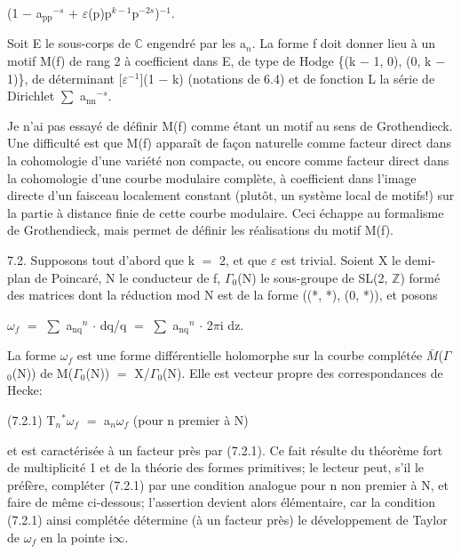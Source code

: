 \documentclass[10pt,twoside]{article}
\begin{document}
(1 \ensuremath{−} a\ensuremath{_{\mathrm{pp}}}\ensuremath{^{-s}} \ensuremath{+} \ensuremath{ε}(p)p\ensuremath{^{k−1}}p\ensuremath{^{-2s}})\ensuremath{^{-1}}.\par
Soit E le sous-corps de \ensuremath{ℂ} engendré par les a\ensuremath{_{n}}. La forme f doit donner lieu à un motif M(f) de rang 2 à coefficient dans E, de type de Hodge \{(k \ensuremath{−} 1, 0), (0, k \ensuremath{−} 1)\}, de déterminant [\ensuremath{ε}\ensuremath{^{-1}}](1 \ensuremath{−} k) (notations de 6.4) et de fonction L la série de Dirichlet \ensuremath{∑} a\ensuremath{_{\mathrm{nn}}}\ensuremath{^{-s}}.\par
Je n’ai pas essayé de définir M(f) comme étant un motif au sens de Grothendieck. Une difficulté est que M(f) apparaît de façon naturelle comme facteur direct dans la cohomologie d’une variété non compacte, ou encore comme facteur direct dans la cohomologie d’une courbe modulaire complète, à coefficient dans l’image directe d’un faisceau localement constant (plutôt, un système local de motifs!) sur la partie à distance finie de cette courbe modulaire. Ceci échappe au formalisme de Grothendieck, mais permet de définir les réalisations du motif M(f).\par
7.2. Supposons tout d’abord que k \ensuremath{=} 2, et que \ensuremath{ε} est trivial. Soient X le demi-plan de Poincaré, N le conducteur de f, \ensuremath{Γ}\ensuremath{_{0}}(N) le sous-groupe de SL(2, \ensuremath{ℤ}) formé des matrices dont la réduction mod N est de la forme ((*, *), (0, *)), et posons\par
\ensuremath{ω}\ensuremath{_{f}} \ensuremath{=} \ensuremath{∑} a\ensuremath{_{\mathrm{nq}}}\ensuremath{^{n}} \ensuremath{·} dq/q \ensuremath{=} \ensuremath{∑} a\ensuremath{_{\mathrm{nq}}}\ensuremath{^{n}} \ensuremath{·} 2\ensuremath{π}i dz.\par
La forme \ensuremath{ω}\ensuremath{_{f}} est une forme différentielle holomorphe sur la courbe complétée \ensuremath{\bar{M}}(\ensuremath{Γ}\ensuremath{_{0}}(N)) de M(\ensuremath{Γ}\ensuremath{_{0}}(N)) \ensuremath{=} X/\ensuremath{Γ}\ensuremath{_{0}}(N). Elle est vecteur propre des correspondances de Hecke:\par
(7.2.1)    T\ensuremath{_{n}}\ensuremath{^{*}}\ensuremath{ω}\ensuremath{_{f}} \ensuremath{=} a\ensuremath{_{n}}\ensuremath{ω}\ensuremath{_{f}}    (pour n premier à N)\par
et est caractérisée à un facteur près par (7.2.1). Ce fait résulte du théorème fort de multiplicité 1 et de la théorie des formes primitives; le lecteur peut, s’il le préfère, compléter (7.2.1) par une condition analogue pour n non premier à N, et faire de même ci-dessous; l’assertion devient alors élémentaire, car la condition (7.2.1) ainsi complétée détermine (à un facteur près) le développement de Taylor de \ensuremath{ω}\ensuremath{_{f}} en la pointe i\ensuremath{∞}.\par
\end{document}
